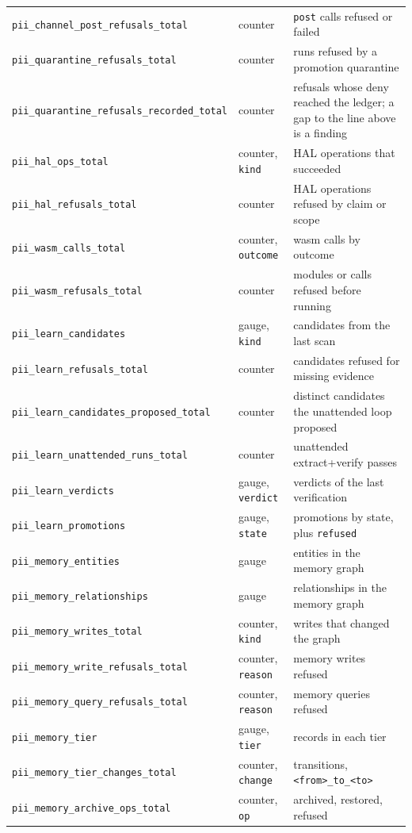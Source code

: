 {\begin{longtable}{@{}>{\raggedright\arraybackslash}p{}>{\raggedright\arraybackslash}p{}>{\raggedright\arraybackslash}p{}@{}}
  \texttt{pii\_channel\_post\_refusals\_total} & counter & \texttt{post} calls refused or failed \\
  \texttt{pii\_quarantine\_refusals\_total} & counter & runs refused by a promotion quarantine \\
  \texttt{pii\_quarantine\_refusals\_recorded\_total} & counter & refusals whose deny reached the
    ledger; a gap to the line above is a finding \\
  \texttt{pii\_hal\_ops\_total} & counter, \texttt{kind} & HAL operations that succeeded \\
  \texttt{pii\_hal\_refusals\_total} & counter & HAL operations refused by claim or scope \\
  \texttt{pii\_wasm\_calls\_total} & counter, \texttt{outcome} & wasm calls by outcome \\
  \texttt{pii\_wasm\_refusals\_total} & counter & modules or calls refused before running \\
  \texttt{pii\_learn\_candidates} & gauge, \texttt{kind} & candidates from the last scan \\
  \texttt{pii\_learn\_refusals\_total} & counter & candidates refused for missing evidence \\
  \texttt{pii\_learn\_candidates\_proposed\_total} & counter & distinct candidates the unattended
    loop proposed \\
  \texttt{pii\_learn\_unattended\_runs\_total} & counter & unattended extract+verify passes \\
  \texttt{pii\_learn\_verdicts} & gauge, \texttt{verdict} & verdicts of the last verification \\
  \texttt{pii\_learn\_promotions} & gauge, \texttt{state} & promotions by state, plus
    \texttt{refused} \\
  \texttt{pii\_memory\_entities} & gauge & entities in the memory graph \\
  \texttt{pii\_memory\_relationships} & gauge & relationships in the memory graph \\
  \texttt{pii\_memory\_writes\_total} & counter, \texttt{kind} & writes that changed the graph \\
  \texttt{pii\_memory\_write\_refusals\_total} & counter, \texttt{reason} & memory writes refused \\
  \texttt{pii\_memory\_query\_refusals\_total} & counter, \texttt{reason} & memory queries refused \\
  \texttt{pii\_memory\_tier} & gauge, \texttt{tier} & records in each tier \\
  \texttt{pii\_memory\_tier\_changes\_total} & counter, \texttt{change} & transitions,
    \texttt{<from>\_to\_<to>} \\
  \texttt{pii\_memory\_archive\_ops\_total} & counter, \texttt{op} & archived, restored, refused \\
  \bottomrule
\end{longtable}
}

